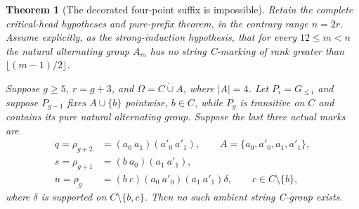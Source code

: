 \documentclass[11pt,a4paper]{article}
\newtheorem{theorem}[lemma]{Theorem}
\begin{document}
\begin{theorem}[The decorated four-point suffix is impossible]
\label{exclude}
Retain the complete critical-head hypotheses and pure-prefix
theorem, in the contrary range $n=2r$. Assume explicitly, as
the strong-induction hypothesis, that for every $12\le m<n$
the natural alternating group $A_m$ has no string C-marking
of rank greater than $\lfloor(m-1)/2\rfloor$.

Suppose $g\ge5$, $r=g+3$, and $\Omega=C\mathbin{\dot\cup}A$,
where $|A|=4$. Let $P_i=G_{\le i}$ and suppose
$P_{g-1}$ fixes $A\cup\{b\}$ pointwise, $b\in C$, while
$P_g$ is transitive on $C$ and contains its pure natural
alternating group. Suppose the last three actual marks are
\[
\begin{split}
 q=\rho_{g+2}&=(a_0\ a_1)(a'_0\ a'_1),\qquad
 A=\{a_0,a'_0,a_1,a'_1\},\\
 s=\rho_{g+1}&=(b\ a_0)(a_1\ a'_1),\\
 u=\rho_g&=(b\ c)(a_0\ a'_0)(a_1\ a'_1)\delta,
 \qquad c\in C\setminus\{b\},
\end{split}
\]
where $\delta$ is supported on $C\setminus\{b,c\}$.
Then no such ambient string C-group exists.
\end{theorem}
\end{document}
